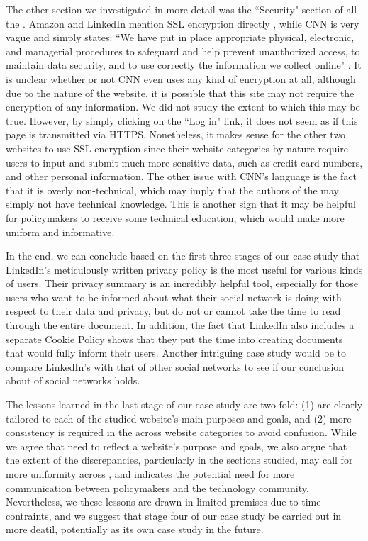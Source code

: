 \documentclass{acm_proc_article-sp}
\begin{document}
The other section we investigated in more detail was the ``Security" section of all the \pps. Amazon and LinkedIn mention SSL encryption directly \cite{amazon,linkedin}, while CNN is very vague and simply states: ``We have put in place appropriate physical, electronic, and managerial procedures to safeguard and help prevent unauthorized access, to maintain data security, and to use correctly the information we collect online" \cite{cnn}. It is unclear whether or not CNN even uses any kind of encryption at all, although due to the nature of the website, it is possible that this site may not require the encryption of any information. We did not study the extent to which this may be true. However, by simply clicking on the ``Log in" link, it does not seem as if this page is transmitted via HTTPS. Nonetheless, it makes sense for the other two websites to use SSL encryption since their website categories by nature require users to input and submit much more sensitive data, such as credit card numbers, and other personal information. The other issue with CNN's language is the fact that it is overly non-technical, which may imply that the authors of the \pp may simply not have technical knowledge. This is another sign that it may be helpful for policymakers to receive some technical education, which would make \pps more uniform and informative.

In the end, we can conclude based on the first three stages of our case study that LinkedIn's meticulously written privacy policy is the most useful for various kinds of users. Their privacy summary is an incredibly helpful tool, especially for those users who want to be informed about what their social network is doing with respect to their data and privacy, but do not or cannot take the time to read through the entire document. In addition, the fact that LinkedIn also includes a separate Cookie Policy shows that they put the time into creating documents that would fully inform their users. Another intriguing case study would be to compare LinkedIn's \pp with that of other social networks to see if our conclusion about \pps of social networks holds. 

The lessons learned in the last stage of our case study are two-fold: (1) \pps are clearly tailored to each of the studied website's main purposes and goals, and (2) more consistency is required in the \pps across website categories to avoid confusion. While we agree that \pps need to reflect a website's purpose and goals, we also argue that the extent of the discrepancies, particularly in the sections studied, may call for more uniformity across \pps, and indicates the potential need for more communication between policymakers and the technology community. Nevertheless, we these lessons are drawn in limited premises due to time contraints, and we suggest that stage four of our case study be carried out in more deatil, potentially as its own case study in the future.
\end{document}
